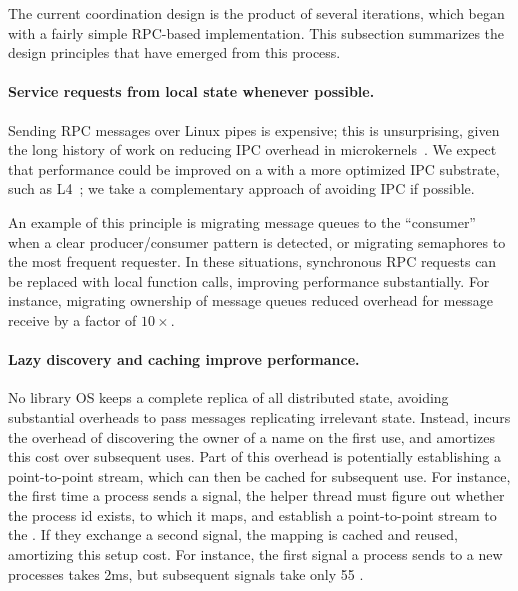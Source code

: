 \label{sec:libos:namespaces:lessons}

The current coordination design is the product of several iterations, which began 
with a fairly simple RPC-based implementation. %
This subsection summarizes the design principles that have emerged from this process.

\paragraph{Service requests from local state whenever possible.}
Sending RPC messages over Linux pipes is expensive;
this is unsurprising, given the long history of 
work on reducing IPC overhead in microkernels~\cite{liedtke93sosp,chen93memory}.  
We expect that \graphene{} performance could be improved on a 
\microkernel{} with
a more optimized IPC substrate, such as L4~\cite{liedtke95sosp,klein09sel4,elphinstone13microkernels};
we take a complementary approach of avoiding IPC if possible.

An example of this principle is migrating message queues to the ``consumer'' when a 
clear producer/consumer pattern is detected, or migrating semaphores to the most frequent requester.
In these situations, synchronous RPC requests can be replaced with local function calls, improving
performance substantially.  For instance, migrating ownership of message queues 
reduced overhead for message receive by a factor of $10\times$.

\paragraph{Lazy discovery and caching improve performance.}  
No library OS keeps a complete replica of all distributed state,
avoiding substantial overheads to pass messages replicating irrelevant state.
Instead, \graphene{} incurs the overhead of discovering the owner of a name
on the first use, and amortizes this cost over subsequent uses.
Part of this overhead is potentially establishing a point-to-point stream,
which can then be cached for subsequent use.
For instance, the first time a process sends a signal, the helper thread 
must figure out whether the process id exists, to which \picoproc{} it maps,
and establish a point-to-point stream to the \picoproc{}.
If they exchange a second signal, the mapping is cached and reused, amortizing this 
setup cost.  For instance, the first signal a process sends to a new processes
takes \roughly{}2ms, but subsequent signals take only \roughly{}55 \us{}.

